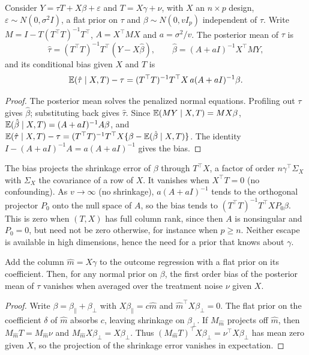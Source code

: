 \begin{proposition}
Consider $Y = \tau T + X\beta + \varepsilon$ and $T = X\gamma + \nu$, with $X$ an $n \times p$ design, $\varepsilon \sim N(0, \sigma^2 I)$, a flat prior on $\tau$ and $\beta \sim N(0, v I_p)$ independent of $\tau$. Write $M = I - T(T^\top T)^{-1}T^\top$, $A=X^\top MX$ and $a=\sigma^2/v$. The posterior mean of $\tau$ is
\[
\hat\tau = (T^\top T)^{-1}T^\top(Y - X\hat\beta), \qquad \hat\beta = (A+aI)^{-1}X^\top MY,
\]
and its conditional bias given $X$ and $T$ is
\[
\mathbb{E}(\hat\tau\mid X,T)-\tau=(T^\top T)^{-1}T^\top X\,a(A+aI)^{-1}\beta.
\]
\end{proposition}

\begin{proof}
The posterior mean solves the penalized normal equations. Profiling out $\tau$ gives $\hat\beta$; substituting back gives $\hat\tau$. Since $\mathbb{E}(MY\mid X,T)=MX\beta$, $\mathbb{E}(\hat\beta\mid X,T)=(A+aI)^{-1}A\beta$, and $\mathbb{E}(\hat\tau\mid X,T)-\tau=(T^\top T)^{-1}T^\top X\{\beta-\mathbb{E}(\hat\beta\mid X,T)\}$. The identity $I-(A+aI)^{-1}A=a(A+aI)^{-1}$ gives the bias.
\end{proof}

The bias projects the shrinkage error of $\beta$ through $T^\top X$, a factor of order $n\gamma^\top\Sigma_X$ with $\Sigma_X$ the covariance of a row of $X$. It vanishes when $X^\top T=0$ (no confounding). As $v\to\infty$ (no shrinkage), $a(A+aI)^{-1}$ tends to the orthogonal projector $P_0$ onto the null space of $A$, so the bias tends to $(T^\top T)^{-1}T^\top XP_0\beta$. This is zero when $(T,X)$ has full column rank, since then $A$ is nonsingular and $P_0=0$, but need not be zero otherwise, for instance when $p\ge n$. Neither escape is available in high dimensions, hence the need for a prior that knows about $\gamma$.

\begin{proposition}
Add the column $\hat m = X\gamma$ to the outcome regression with a flat prior on its coefficient. Then, for any normal prior on $\beta$, the first order bias of the posterior mean of $\tau$ vanishes when averaged over the treatment noise $\nu$ given $X$.
\end{proposition}

\begin{proof}
Write $\beta=\beta_\parallel+\beta_\perp$ with $X\beta_\parallel=c\hat m$ and $\hat m^\top X\beta_\perp=0$. The flat prior on the coefficient $\delta$ of $\hat m$ absorbs $c$, leaving shrinkage on $\beta_\perp$. If $M_{\hat m}$ projects off $\hat m$, then $M_{\hat m}T=M_{\hat m}\nu$ and $M_{\hat m}X\beta_\perp=X\beta_\perp$. Thus $(M_{\hat m}T)^\top X\beta_\perp=\nu^\top X\beta_\perp$ has mean zero given $X$, so the projection of the shrinkage error vanishes in expectation.
\end{proof}

